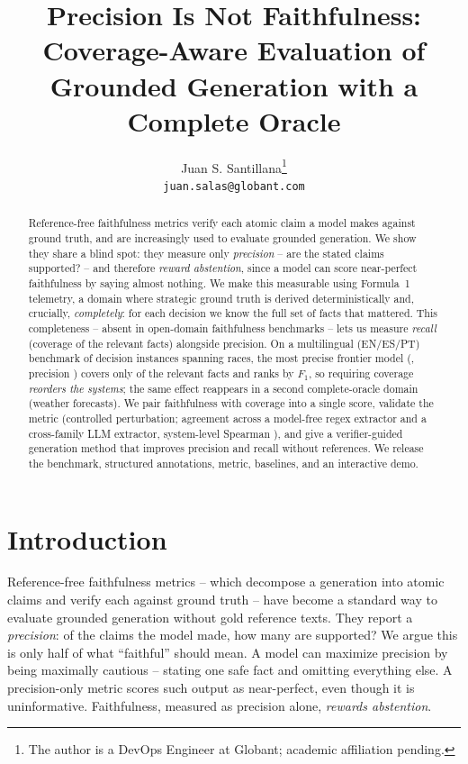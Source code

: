 \documentclass[11pt]{article}
\title{Precision Is Not Faithfulness: Coverage-Aware Evaluation of\\
Grounded Generation with a Complete Oracle}
\author{Juan S. Santillana\thanks{The author is a DevOps Engineer at Globant;
  academic affiliation pending.} \\
  \texttt{juan.salas@globant.com}}
\begin{document}
\maketitle

\begin{abstract}
Reference-free faithfulness metrics verify each atomic claim a model makes against
ground truth, and are increasingly used to evaluate grounded generation. We show they
share a blind spot: they measure only \emph{precision} -- are the stated claims
supported? -- and therefore \emph{reward abstention}, since a model can score
near-perfect faithfulness by saying almost nothing. We make this measurable using
Formula~1 telemetry, a domain where strategic ground truth is derived deterministically
and, crucially, \emph{completely}: for each decision we know the full set of facts that
mattered. This completeness -- absent in open-domain faithfulness benchmarks -- lets us
measure \emph{recall} (coverage of the relevant facts) alongside precision. On a
multilingual (EN/ES/PT) benchmark of \FOneNumInstances{} decision instances spanning
\FOneNumRaces{} races, the most precise frontier model (\CovFlipModel{}, precision
\CovFlipPrec{}) covers only \CovFlipRecall{} of the relevant facts and ranks
\CovFlipFRank{} by $F_1$, so requiring coverage \emph{reorders the systems}; the same
effect reappears in a second complete-oracle domain (weather forecasts). We
pair faithfulness with coverage into a single score, validate the metric (controlled
perturbation; agreement across a model-free regex extractor and a cross-family LLM
extractor, system-level Spearman \XfamSpearman{}), and give a verifier-guided generation
method that improves precision and recall without references. We release the benchmark,
structured annotations, metric, baselines, and an interactive demo.
\end{abstract}

\section{Introduction}
Reference-free faithfulness metrics -- which decompose a generation into atomic claims
and verify each against ground truth
\citep{min2023factscore,fabbri2022qafacteval} -- have become a standard way to evaluate
grounded generation without gold reference texts. They report a \emph{precision}: of the
claims the model made, how many are supported? We argue this is only half of what
``faithful'' should mean. A model can maximize precision by being maximally cautious --
stating one safe fact and omitting everything else. A precision-only metric scores such
output as near-perfect, even though it is uninformative. Faithfulness, measured as
precision alone, \emph{rewards abstention}.
\end{document}
